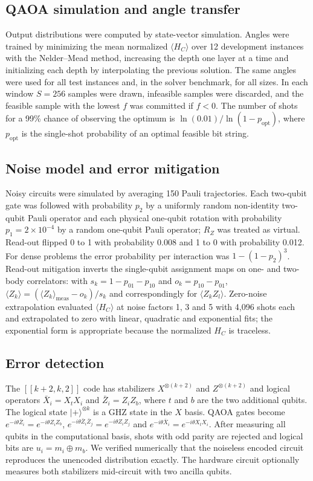 \documentclass[12pt,a4paper]{article}
\begin{document}
\subsection*{QAOA simulation and angle transfer}
Output distributions were computed by state-vector simulation. Angles were trained by minimizing the mean normalized $\langle H_{C}\rangle$ over 12 development instances with the Nelder--Mead method, increasing the depth one layer at a time and initializing each depth by interpolating the previous solution\cite{zhou2020}. The same angles were used for all test instances and, in the solver benchmark, for all sizes. In each window $S=256$ samples were drawn, infeasible samples were discarded, and the feasible sample with the lowest $f$ was committed if $f<0$. The number of shots for a 99\% chance of observing the optimum is $\ln(0.01)/\ln(1-p_{\mathrm{opt}})$, where $p_{\mathrm{opt}}$ is the single-shot probability of an optimal feasible bit string.

\subsection*{Noise model and error mitigation}
Noisy circuits were simulated by averaging 150 Pauli trajectories. Each two-qubit gate was followed with probability $p_{2}$ by a uniformly random non-identity two-qubit Pauli operator and each physical one-qubit rotation with probability $p_{1}=2\times10^{-4}$ by a random one-qubit Pauli operator; $R_{Z}$ was treated as virtual. Read-out flipped 0 to 1 with probability 0.008 and 1 to 0 with probability 0.012. For dense problems the error probability per interaction was $1-(1-p_{2})^{3}$. Read-out mitigation inverts the single-qubit assignment maps on one- and two-body correlators: with $s_{k}=1-p_{01}-p_{10}$ and $o_{k}=p_{10}-p_{01}$, $\langle Z_{k}\rangle=(\langle Z_{k}\rangle_{\mathrm{meas}}-o_{k})/s_{k}$ and correspondingly for $\langle Z_{k}Z_{l}\rangle$. Zero-noise extrapolation evaluated $\langle H_{C}\rangle$ at noise factors 1, 3 and 5 with 4,096 shots each and extrapolated to zero with linear, quadratic and exponential fits; the exponential form is appropriate because the normalized $H_{C}$ is traceless.

\subsection*{Error detection}
The $[[k+2,k,2]]$ code has stabilizers $X^{\otimes(k+2)}$ and $Z^{\otimes(k+2)}$ and logical operators $\bar X_{i}=X_{t}X_{i}$ and $\bar Z_{i}=Z_{i}Z_{b}$, where $t$ and $b$ are the two additional qubits\cite{self2024}. The logical state $\lvert+\rangle^{\otimes k}$ is a GHZ state in the $X$ basis. QAOA gates become $e^{-i\theta\bar Z_{i}}=e^{-i\theta Z_{i}Z_{b}}$, $e^{-i\theta\bar Z_{i}\bar Z_{j}}=e^{-i\theta Z_{i}Z_{j}}$ and $e^{-i\theta\bar X_{i}}=e^{-i\theta X_{t}X_{i}}$\cite{he2024}. After measuring all qubits in the computational basis, shots with odd parity are rejected and logical bits are $u_{i}=m_{i}\oplus m_{b}$. We verified numerically that the noiseless encoded circuit reproduces the unencoded distribution exactly. The hardware circuit optionally measures both stabilizers mid-circuit with two ancilla qubits.
\end{document}
